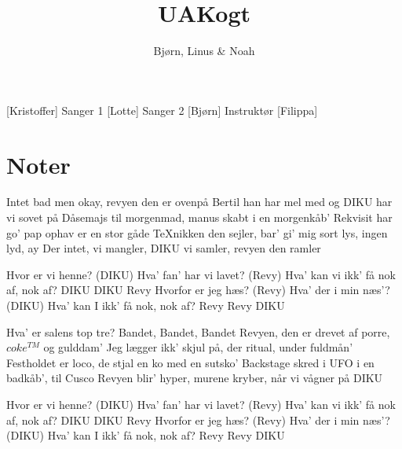 \documentclass[a4paper,11pt]{article}
\title{UAKogt}
\author{Bjørn, Linus \& Noah}
\begin{document}
\maketitle

\begin{roles}
[Kristoffer] Sanger 1
[Lotte] Sanger 2
[Bjørn] Instruktør
[Filippa]
\end{roles} 

\section*{Noter}


\begin{props}
\prop{}
\prop{}
\prop{}
\prop{}
\prop{}
\prop{}
\end{props}



\begin{song}
 Intet bad men okay, revyen den er ovenpå
Bertil han har mel med og DIKU har vi sovet på
Dåsemajs til morgenmad, manus skabt i en
morgenkåb'
Rekvisit har go' pap ophav er en stor gåde
 TeXnikken den sejler, bar' gi' mig sort lys, ingen lyd,
ay
Der intet, vi mangler, DIKU vi samler, revyen den
ramler

Hvor er vi henne? (DIKU)
 Hva' fan' har vi lavet? (Revy)
 Hva' kan vi ikk' få nok af, nok af?
DIKU DIKU Revy
 Hvorfor er jeg hæs? (Revy)
 Hva' der i min næs'? (DIKU)
 Hva' kan I ikk' få nok, nok af?
Revy Revy  DIKU


Hva' er salens top tre? Bandet, Bandet, Bandet
Revyen, den er drevet af porre, $coke^{TM}$ og
gulddam'
Jeg lægger ikk' skjul på, der  ritual, under fuldmån'
Festholdet er loco, de stjal en ko med en sutsko'
Backstage skred i UFO i en badkåb', til Cusco
Revyen blir' hyper, murene kryber, når vi
vågner på DIKU

Hvor er vi henne? (DIKU)
Hva' fan' har vi lavet? (Revy)
Hva' kan vi ikk' få nok af, nok af?
DIKU DIKU Revy
Hvorfor er jeg hæs? (Revy)
Hva' der i min næs'? (DIKU)
Hva' kan I ikk' få nok, nok af?
Revy Revy  DIKU

\end{song}
\end{document}
